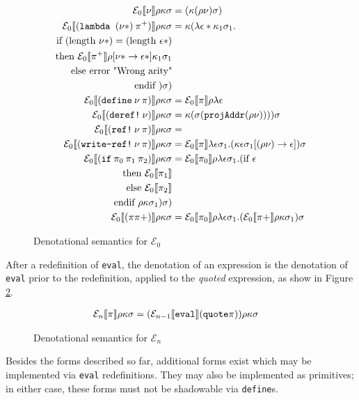 \begin{figure}[H]
\begin{align*}
    \denotationdesc{0}{\variable}{(\cont (\env \variable) \mem)} \\
    \denotationdesc{0}{(\lam (\variable *)\: \pi^{+})}{
      \cont (\lambda \val * \cont_1 \mem_1 . \\
        \text{if } (\text{length } \variable *) = (\text{length } \val *) \\
        \text{then } \denotation{0}{\pi^{+}}\env[\variable * \rightarrow} \val * ] \cont_1 \mem_1 \\
        \text{else } \text{error "Wrong arity"} \\
        \text{endif } ) \mem ) \\
    \denotationdesc{0}{(\define \: \variable \: \pi )}{
      \denotation{0}{\pi}\env \lambda \val
    } \\
    \denotationdesc{0}{(\deref \: \variable  )}{\cont (\mem (\texttt{projAddr}(\env \variable)))) \mem} \\
  \denotationdesc{0}{(\mkref \: \variable \: \pi)}{} \\
  \denotationdesc{0}{(\writeref \: \variable \: \pi)}{
      \denotation{0}{\pi} \lambda \val \mem_1 . (\cont \val \mem_1 [(\env
      \variable) \rightarrow \val]) \mem } \\
  \denotationdesc{0}{(\ifm \: \pi_0 \: \pi_1 \: \pi_2)}{\denotation{0}{\pi_0}\env
    \lambda \val \mem_1 .(\text{if } \val  \\
    \text{then } \denotation{0}{\pi_1}  \\
    \text{else } \denotation{0}{\pi_2} \\
    \text{endif } \env \cont \mem_1)  \mem ) } \\
  \denotationdesc{0}{(\pi \pi+ )}{
      \denotation{0}{\pi_0}\env \lambda \val \mem_1 . (\denotation{0}{\pi+}
      \env \cont \mem_1) \mem
  }
\end{align*}
\caption{Denotational semantics for $\mathcal{E}_{0}$}
\label{f:denotationalsem0}
\end{figure}

After a redefinition of \texttt{eval}, the denotation of an expression is the
denotation of \texttt{eval} prior to the redefinition, applied to the
\emph{quoted} expression, as show in Figure \ref{f:denotationalsemn}.

\begin{figure}[H]
\begin{align*}
  \mathcal{E}_{n} \llbracket \pi \rrbracket \rho \kappa \sigma &= (\mathcal{E}_{n-1} \llbracket \text{\texttt{eval}} \rrbracket  (\text{\texttt{quote}} \pi))\rho\kappa\sigma 
\end{align*}
\caption{Denotational semantics for $\mathcal{E}_{n}$}
\label{f:denotationalsemn}
\end{figure}

Besides the forms described so far, additional forms exist which may be
implemented via \texttt{eval} redefinitions. They may also be implemented as
primitives; in either case, these forms must not be shadowable via
\texttt{define}s.
